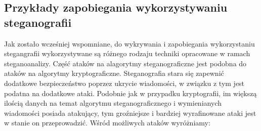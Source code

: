 \documentclass[a4paper, twoside]{report}
\begin{document}
        \subsection{Przykłady zapobiegania wykorzystywaniu steganografii}
        Jak zostało wcześniej wspomniane, do wykrywania i zapobiegania wykorzystaniu stegangrafii
        wykorzystywane są różnego rodzaju techniki opracowane w ramach steganoanalizy.
        Część ataków na alagorytmy steganograficzne jest podobna do ataków na
        algorytmy kryptograficzne. Steganografia stara się zapewnić dodatkowe bezpieczeństwo
        poprzez ukrycie wiadomości, w związku z tym jest podatna na dodatkowe ataki.
        Podobnie jak w przypadku kryptografii, im większą ilością danych na temat
        algorytmu steganograficznego i wymienianych wiadomości posiada atakujący,
        tym groźniejsze i bardziej wyrafinowane ataki jest w stanie on przeprowadzić.
        Wśród możliwych ataków wyróżniamy\cite{DISAPPEARINGCRYPTOEMBEDDINGMETDATA}:
\end{document}
